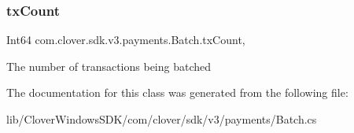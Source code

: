 \subsubsection{\texorpdfstring{tx\+Count}{txCount}}
{\footnotesize\ttfamily Int64 com.\+clover.\+sdk.\+v3.\+payments.\+Batch.\+tx\+Count\hspace{0.3cm}{\ttfamily [get]}, {\ttfamily [set]}}



The number of transactions being batched 



The documentation for this class was generated from the following file\+:\begin{DoxyCompactItemize}
\item 
lib/\+Clover\+Windows\+S\+D\+K/com/clover/sdk/v3/payments/Batch.\+cs\end{DoxyCompactItemize}
